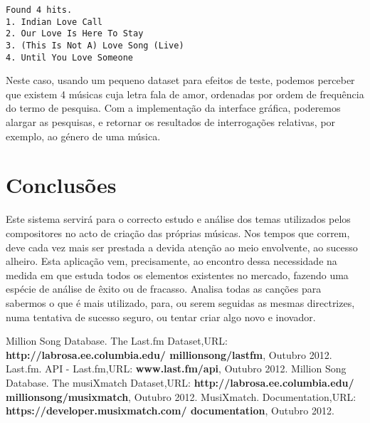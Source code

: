 \documentclass[twocolumn,twoside,10pt,a4paper]{article}
\begin{document}
\begin{verbatim}
Found 4 hits.
1. Indian Love Call
2. Our Love Is Here To Stay
3. (This Is Not A) Love Song (Live)
4. Until You Love Someone
\end{verbatim}

Neste caso, usando um pequeno dataset para efeitos de teste, podemos perceber que existem 4 músicas cuja letra fala de amor, ordenadas por ordem de frequência do termo de pesquisa. Com a implementação da interface gráfica, poderemos alargar as pesquisas, e retornar os resultados de interrogações relativas, por exemplo, ao género de uma música.

\section{Conclusões}\label{sec:conclude}

Este sistema servirá para o correcto estudo e análise dos temas utilizados pelos compositores no acto de criação das próprias músicas. Nos tempos que correm, deve cada vez mais ser prestada a devida atenção ao meio envolvente, ao sucesso alheiro. Esta aplicação vem, precisamente, ao encontro dessa necessidade na medida em que estuda todos os elementos existentes no mercado, fazendo uma espécie de análise de êxito ou de fracasso. Analisa todas as canções para sabermos o que é mais utilizado, para, ou serem seguidas as mesmas directrizes, numa tentativa de sucesso seguro, ou tentar criar algo novo e inovador.

\begin{thebibliography}{4}  
 Million Song Database. The Last.fm Dataset,URL: \textbf{http://labrosa.ee.columbia.edu/
millionsong/lastfm}, Outubro 2012.
 Last.fm. API - Last.fm,URL: \textbf{www.last.fm/api}, Outubro 2012.
 Million Song Database.  The musiXmatch Dataset,URL: \textbf{http://labrosa.ee.columbia.edu/
millionsong/musixmatch}, Outubro 2012.
 MusiXmatch. Documentation,URL: \textbf{https://developer.musixmatch.com/
documentation}, Outubro 2012.
\end{thebibliography}
\end{document}
